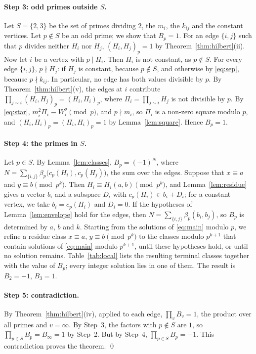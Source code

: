 \documentclass[11pt]{article}
\begin{document}
\paragraph{Step 3: odd primes outside $S$.} Let $S=\{2,3\}$ be the set of primes dividing $2$, the $m_{i}$, the $k_{ij}$ and the constant vertices. Let $p\notin S$ be an odd prime; we show that $B_p=1$. For an edge $\{i,j\}$ such that $p$ divides neither $H_i$ nor $H_j$, $(H_i,H_j)_p=1$ by Theorem~\ref{thm:hilbert}(ii). Now let $i$ be a vertex with $p\mid H_i$. Then $H_i$ is not constant, as $p\notin S$. For every edge $\{i,j\}$, $p\nmid H_j$: if $H_j$ is constant, because $p\notin S$, and otherwise by \eqref{eq:sep}, because $p\nmid k_{ij}$. In particular, no edge has both values divisible by $p$. By Theorem~\ref{thm:hilbert}(v), the edges at $i$ contribute $\prod_{j\sim i}(H_i,H_j)_p=(H_i,\Pi_i)_p$, where $\Pi_i=\prod_{j\sim i}H_j$ is not divisible by $p$. By \eqref{eq:star}, $m_i^2\Pi_i\equiv W_i^2\pmod p$, and $p\nmid m_i$, so $\Pi_i$ is a non-zero square modulo $p$, and $(H_i,\Pi_i)_p=(\Pi_i,H_i)_p=1$ by Lemma~\ref{lem:square}. Hence $B_p=1$.

\paragraph{Step 4: the primes in $S$.} Let $p\in S$. By Lemma~\ref{lem:classes}, $B_p=(-1)^{N}$, where $N=\sum_{\{i,j\}}\beta_p\bigl(c_p(H_i),c_p(H_j)\bigr)$, the sum over the edges. Suppose that $x\equiv a$ and $y\equiv b\pmod{p^k}$. Then $H_i\equiv H_i(a,b)\pmod{p^k}$, and Lemma~\ref{lem:residue} gives a vector $b_i$ and a subspace $D_i$ with $c_p(H_i)\in b_i+D_i$; for a constant vertex, we take $b_i=c_p(H_i)$ and $D_i=0$. If the hypotheses of Lemma~\ref{lem:envelope} hold for the edges, then $N=\sum_{\{i,j\}}\beta_p(b_i,b_j)$, so $B_p$ is determined by $a$, $b$ and $k$. Starting from the solutions of \eqref{eq:main} modulo $p$, we refine a residue class $x\equiv a$, $y\equiv b\pmod{p^k}$ to the classes modulo $p^{k+1}$ that contain solutions of \eqref{eq:main} modulo $p^{k+1}$, until these hypotheses hold, or until no solution remains. Table~\ref{tab:local} lists the resulting terminal classes together with the value of $B_p$; every integer solution lies in one of them. The result is $B_{2}=-1$, $B_{3}=1$.

\paragraph{Step 5: contradiction.} By Theorem~\ref{thm:hilbert}(iv), applied to each edge, $\prod_vB_v=1$, the product over all primes and $v=\infty$. By Step~3, the factors with $p\notin S$ are $1$, so $\prod_{p\in S}B_p=B_\infty=1$ by Step~2. But by Step~4, $\prod_{p\in S}B_p=-1$. This contradiction proves the theorem.
\qed
\end{document}
